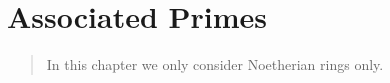 \documentclass[../main]{subfiles}
\begin{document}
\chapter{Associated Primes}\label{ch:03}

\begin{quote}
In this chapter we only consider Noetherian rings only.
\end{quote}

\setcounter{section}{6}



\end{document}
